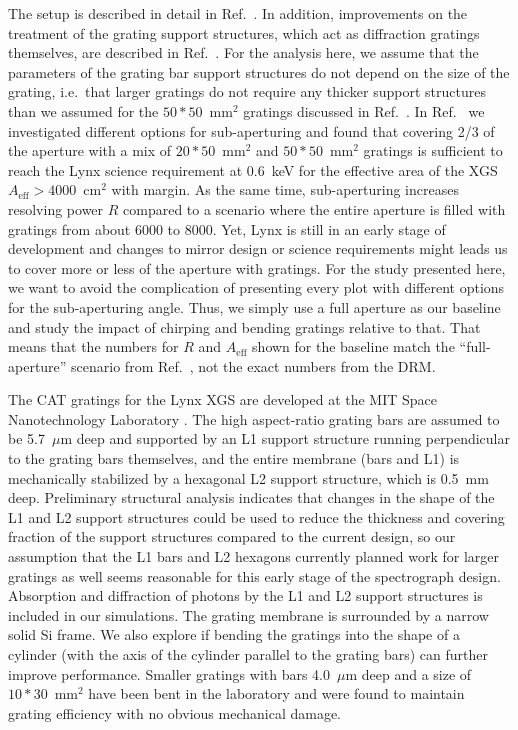 \documentclass[]{spie}  %
\begin{document}
The setup is described in detail in Ref.~. In addition, improvements on the treatment of the grating support structures, which act as diffraction gratings themselves, are described in Ref.~. For the analysis here, we assume that the parameters of the grating bar support structures do not depend on the size of the grating, i.e.\ that larger gratings do not require any thicker support structures than we assumed for the $50*50$~mm$^2$ gratings discussed in Ref.~. In Ref.~\cite{CATXGS} we investigated different options for sub-aperturing and found that covering 2/3 of the aperture with a mix of $20*50$~mm$^2$ and $50*50$~mm$^2$ gratings is sufficient to reach the Lynx science requirement at 0.6~keV for the effective area of the XGS $A_{\mathrm{eff}} > 4000$~cm$^2$ with margin. As the same time, sub-aperturing increases resolving power $R$ compared to a scenario where the entire aperture is filled with gratings from about 6000 to 8000. Yet, Lynx is still in an early stage of development and changes to mirror design or science requirements might leads us to cover more or less of the aperture with gratings. For the study presented here, we want to avoid the complication of presenting every plot with different options for the sub-aperturing angle. Thus, we simply use a full aperture as our baseline and study the impact of chirping and bending gratings relative to that. That means that the numbers for $R$ and $A_{\mathrm{eff}}$ shown for the baseline match the ``full-aperture'' scenario from Ref.~, not the exact numbers from the DRM.

The CAT gratings for the Lynx XGS are developed at the
MIT Space Nanotechnology Laboratory
\cite{Heilmann:11,doi:10.1117/12.2188525,10.1117/12.2314180,10.1117/12.2529354}. The high aspect-ratio grating bars are assumed to be
5.7~$\mu$m deep and supported by an L1 support structure running
perpendicular to the grating bars themselves, and the entire membrane
(bars and L1) is mechanically stabilized by a hexagonal L2 support
structure, which is 0.5~mm deep. 
Preliminary structural analysis indicates that changes in the shape of the L1 and L2 support structures could be used to reduce the thickness and covering fraction of the support structures compared to the current design, so our assumption that the L1 bars and L2 hexagons currently planned work for larger gratings as well seems reasonable for this early stage of the spectrograph design.
Absorption and diffraction of photons
by the L1 and L2 support structures is included in our
simulations. The grating membrane is surrounded by a narrow solid Si frame. We also explore if bending the gratings into the shape of a cylinder (with the axis of the cylinder parallel to the grating bars) can further improve performance. Smaller gratings with bars 4.0~$\mu$m deep and a size of $10 * 30$~mm$^2$ have been bent in the laboratory and were found to maintain grating efficiency with no obvious mechanical damage\cite{10.1117/12.2274205}.
\end{document}
